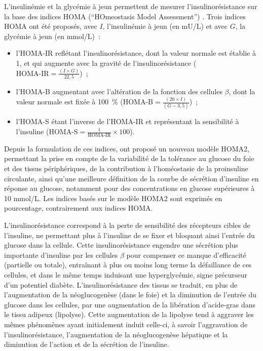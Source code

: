\documentclass[11pt,a4paper,notrimn]{krantz}
\theoremstyle{definition}
\theoremstyle{definition}
\theoremstyle{remark}
\begin{document}
L'insulinémie et la glycémie à jeun permettent de mesurer
l'insulinorésistance sur la base des indices HOMA (``HOmeostasis Model
Assessment'') \citep{matthews_homeostasis_1985}. Trois indices HOMA ont
été proposés, avec \(I\), l'insulinémie à jeun (en mU/L) et avec \(G\),
la glycémie à jeun (en mmol/L)~:

\begin{itemize}
\item
  l'HOMA-IR reflétant l'insulinorésistance, dont la valeur normale est
  établie à 1, et qui augmente avec la gravité de l'insulinorésistance
  (\(\textrm{HOMA-IR}=\frac{(I\times G)}{22,5}\))~;
\item
  l'HOMA-B augmentant avec l'altération de la fonction des cellules
  \(\beta\), dont la valeur normale est fixée à 100~\%
  (\(\textrm{HOMA-B}=\frac{(20\times I)}{(G-3,5)}\))~;
\item
  l'HOMA-S étant l'inverse de l'HOMA-IR et représentant la sensibilité à
  l'insuline (\(\textrm{HOMA-S}=\frac{1}{\textrm{HOMA-IR}}\times 100\)).
\end{itemize}

Depuis la formulation de ces indices, \citet{levy_correct_1998} ont
proposé un nouveau modèle HOMA2, permettant la prise en compte de la
variabilité de la tolérance au glucose du foie et des tissus
périphériques, de la contribution à l'homéostasie de la proinsuline
circulante, ainsi qu'une meilleure définition de la courbe de sécrétion
d'insuline en réponse au glucose, notamment pour des concentrations en
glucose supérieures à 10 mmol/L. Les indices basés sur le modèle HOMA2
sont exprimés en pourcentage, contrairement aux indices HOMA.

L'insulinorésistance correspond à la perte de sensibilité des récepteurs
cibles de l'insuline, ne permettant plus à l'insuline de se fixer et
bloquant ainsi l'entrée du glucose dans la cellule. Cette
insulinorésistance engendre une sécrétion plus importante d'insuline par
les cellules \(\beta\) pour compenser ce manque d'efficacité (partielle
ou totale), entraînant à plus ou moins long terme la défaillance de ces
cellules, et dans le même temps induisant une hyperglycémie, signe
précurseur d'un potentiel diabète. L'insulinorésistance des tissus se
traduit, en plus de l'augmentation de la néoglucogenèse (dans le foie)
et la diminution de l'entrée du glucose dans les cellules, par une
augmentation de la libération d'acide-gras dans le tissu adipeux
(lipolyse). Cette augmentation de la lipolyse tend à aggraver les mêmes
phénomènes ayant initialement induit celle-ci, à savoir l'aggravation de
l'insulinorésistance, l'augmentation de la néoglucogenèse hépatique et
la diminution de l'action et de la sécrétion de l'insuline.
\end{document}
